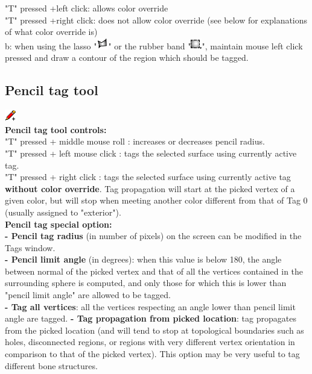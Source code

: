  "T" pressed +left click: allows color override\\
 "T" pressed +right click: does not allow color override (see below for explanations of what color override is)\\
b: when using the lasso "\includegraphics[scale=0.7]{images/12/lasso.png}" or the rubber band "\includegraphics[scale=0.7]{images/12/rubber_band.png}", maintain mouse left click pressed and draw a contour of the region which should be tagged.



\subsection{Pencil tag tool}
\includegraphics[scale=0.7]{images/12/pencil.png}\\
\textbf{Pencil tag tool controls:}\\
"T" pressed + middle mouse roll : increases or decreases pencil radius.\\
"T" pressed + left mouse click : tags the selected surface using currently active tag.\\
"T" pressed + right click : tags the selected surface using currently active tag \textbf{without color override}. Tag propagation will start at the picked vertex of a given color, but will stop when meeting another color different from that of Tag 0 (usually assigned to "exterior").\\

\textbf{Pencil tag special option:}\\
\noindent
\textbf{- Pencil tag radius} (in number of pixels) on the screen can be modified in the Tags window.\\
\textbf{- Pencil limit angle} (in degrees): when this value is below 180, the angle between normal of the picked vertex and that of all the vertices contained in the surrounding sphere is computed, and only those for which this is lower than "pencil limit angle" are allowed to be tagged.\\
\textbf{- Tag all vertices}: all the vertices respecting an angle lower than pencil limit angle are tagged.
\textbf{- Tag propagation from picked location}: tag propagates from the picked location (and will tend to stop at topological boundaries such as holes, disconnected regions,  or regions with very different vertex orientation in comparison to that of the picked vertex). This option may be very useful to tag different bone structures.




